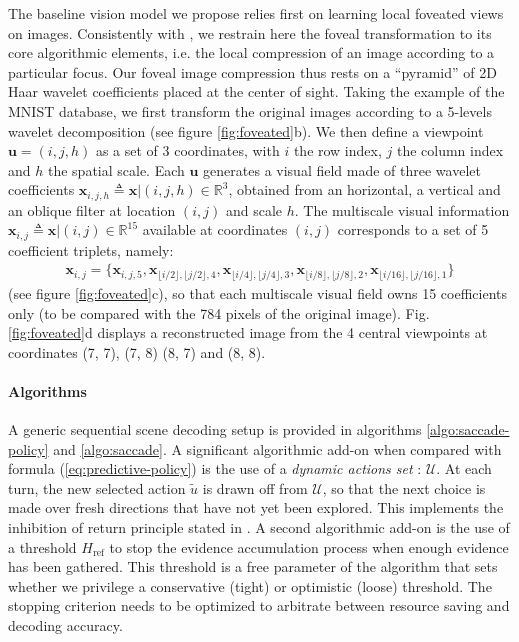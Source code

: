 \documentclass[12pt,twoside,openright]{article}
\begin{document}
The baseline vision model we propose relies first on learning local foveated views on images.
Consistently with \citep{kortum1996implementation,wang2003foveation}, we restrain here the foveal transformation to its core algorithmic elements, i.e. the local compression of an image according to a particular focus. Our foveal image compression thus rests on a ``pyramid'' of 2D Haar wavelet coefficients placed at the center of sight. Taking the example of the MNIST database, we first transform the original images according to a 5-levels wavelet decomposition (see figure \ref{fig:foveated}b). We then define a viewpoint $\boldsymbol{u} = (i,j,h)$ as a set of 3 coordinates, with $i$ the row index, $j$ the column index and $h$ the spatial scale. Each $\boldsymbol{u}$ generates a visual field made of three wavelet coefficients $\boldsymbol{x}_{i,j,h} \triangleq\boldsymbol{x}|(i,j,h) \in \mathbb{R}^3$, obtained from an horizontal, a vertical and an oblique filter at location $(i,j)$ and scale $h$.  The multiscale visual information $\boldsymbol{x}_{i,j}\triangleq\boldsymbol{x}|(i,j) \in \mathbb{R}^{15}$ available at coordinates $(i,j)$ corresponds to a set of 5 coefficient triplets, namely:
\begin{align}
\boldsymbol{x}_{i,j}=\{\boldsymbol{x}_{i,j,5}, \boldsymbol{x}_{\lfloor i/2\rfloor,\lfloor j/2\rfloor,4}, \boldsymbol{x}_{\lfloor i/4\rfloor,\lfloor j/4\rfloor,3}, \boldsymbol{x}_{\lfloor i/8\rfloor,\lfloor j/8\rfloor, 2}, \boldsymbol{x}_{\lfloor i/16\rfloor,\lfloor j/16\rfloor, 1}\}\label{eq:fovea-based-obs}
\end{align} 
(see figure \ref{fig:foveated}c), so that each multiscale visual field owns 15 coefficients only (to be compared with the 784 pixels of the original image).
Fig. \ref{fig:foveated}d displays a reconstructed image from the 4 central viewpoints at coordinates (7, 7), (7, 8) (8, 7) and (8, 8).

\paragraph{Algorithms}

A generic sequential scene decoding setup is provided in algorithms \ref{algo:saccade-policy} and \ref{algo:saccade}. A significant algorithmic add-on when compared with formula
(\ref{eq:predictive-policy}) is the use of a \emph{dynamic actions set} : $\mathcal{U}$. At each turn, the new selected action $\tilde{u}$ is drawn off from $\mathcal{U}$, so that the next choice is made over fresh directions that have not yet been explored. This implements the inhibition of return principle stated in \citep{itti2001computational}. A second algorithmic add-on is the use of a threshold $H_\text{ref}$ to stop the evidence accumulation process when enough evidence has been gathered. This threshold is a free parameter of the algorithm that sets whether we privilege a conservative (tight) or optimistic (loose) threshold. The stopping criterion needs to be optimized to arbitrate between resource saving and decoding accuracy. 
\end{document}
